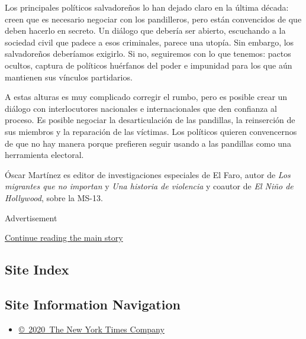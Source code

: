 Los principales políticos salvadoreños lo han dejado claro en la última
década: creen que es necesario negociar con los pandilleros, pero están
convencidos de que deben hacerlo en secreto. Un diálogo que debería ser
abierto, escuchando a la sociedad civil que padece a esos criminales,
parece una utopía. Sin embargo, los salvadoreños deberíamos exigirlo. Si
no, seguiremos con lo que tenemos: pactos ocultos, captura de políticos
huérfanos del poder e impunidad para los que aún mantienen sus vínculos
partidarios.

A estas alturas es muy complicado corregir el rumbo, pero es posible
crear un diálogo con interlocutores nacionales e internacionales que den
confianza al proceso. Es posible negociar la desarticulación de las
pandillas, la reinserción de sus miembros y la reparación de las
víctimas. Los políticos quieren convencernos de que no hay manera porque
prefieren seguir usando a las pandillas como una herramienta electoral.

Óscar Martínez es editor de investigaciones especiales de El Faro, autor
de \emph{Los migrantes que no importan} y \emph{Una historia de
violencia} y coautor de \emph{El Niño de Hollywood}, sobre la MS-13.

Advertisement

\protect\hyperlink{after-bottom}{Continue reading the main story}

\hypertarget{site-index}{%
\subsection{Site Index}\label{site-index}}

\hypertarget{site-information-navigation}{%
\subsection{Site Information
Navigation}\label{site-information-navigation}}

\begin{itemize}
\tightlist
\item
  \href{https://help.nytimes3xbfgragh.onion/hc/en-us/articles/115014792127-Copyright-notice}{©~2020~The
  New York Times Company}
\end{itemize}


